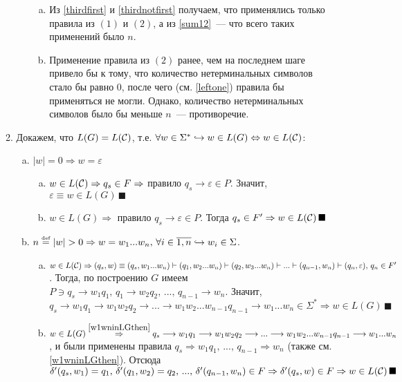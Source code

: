 \documentclass[a4paper]{article}
\def\C{{\cal C}}
\def\eqdef{\overset{\mbox{\tiny def}}{=}}
\begin{document}
\begin{enumerate}
\begin{enumerate}[1.]
\begin{enumerate}[a.]
\begin{enumerate}[a.]
\item Из \ref{thirdfirst} и \ref{thirdnotfirst} получаем, что применялись только правила из $(1)$ и $(2)$, а из \ref{sum12}~--- что всего таких применений было $n$.
\item Применение правила из $(2)$ ранее, чем на последнем шаге привело бы к тому, что количество нетерминальных символов стало бы равно $0$, после чего (см. \ref{leftone}) правила бы применяться не могли. Однако, количество нетерминальных символов было бы меньше $n$~--- противоречие.
\end{enumerate}
\end{enumerate}
\item Докажем, что $L(G)=L(\C)$, т.е. $\forall w\in\Sigma^*\hookrightarrow w\in L(G)\Leftrightarrow w\in L(\C)$:
\begin{enumerate}[a.]
\item $|w|=0\Rightarrow w=\varepsilon$\begin{enumerate}[a.]
\item $w\in L(\C)\Rightarrow q_s\in F\Rightarrow$ правило $q_s\longrightarrow\varepsilon\in P$. Значит, $\varepsilon\equiv w\in L(G)\,\blacksquare$
\item $w\in L(G)\Rightarrow$ правило $q_s\longrightarrow\varepsilon\in P$. Тогда $q_s\in F'\Rightarrow w\in L(\C)\,\blacksquare$
\end{enumerate}
\item $n\eqdef |w|>0\Rightarrow w=w_1...w_n,\,\forall i\in\overline{1,n}\hookrightarrow w_i\in\Sigma$.\begin{enumerate}[a.]
\item $w\in L(\C)\Rightarrow (q_s,w)\equiv(q_s,w_1...w_n)\vdash(q_1,w_2...w_n)\vdash(q_2,w_3...w_n)\vdash...\vdash(q_{n-1},w_n)\vdash(q_n,\varepsilon),\,q_n\in F'$. Тогда, по построению $G$ имеем $P\ni q_s\longrightarrow w_1q_1,\,q_1\longrightarrow w_2q_2,\,...,\,q_{n-1}\longrightarrow w_n$. Значит,\newline
$q_s\longrightarrow w_1q_1\longrightarrow w_1w_2q_2\longrightarrow...\longrightarrow w_1w_2...w_{n-1}q_{n-1}\longrightarrow w_1...w_n\in\Sigma^*\Rightarrow w\in L(G)\,\blacksquare$
\item $w\in L(G)\overset{\ref{w1wninLGthen}}{\Rightarrow}q_s\longrightarrow w_1q_1\longrightarrow w_1w_2q_2\longrightarrow...\longrightarrow w_1w_2...w_{n-1}q_{n-1}\longrightarrow w_1...w_n$, и были применены правила $q_s\Rightarrow w_1q_1,\,...,\,q_{n-1}\Rightarrow w_n$ (также см. \ref{w1wninLGthen}).\newline
Отсюда $\delta'(q_s,w_1)=q_1,\,\delta'(q_1,w_2)=q_2,\,...,\,\delta'(q_{n-1},w_n)\in F\Rightarrow\delta'(q_s,w)\in F\Rightarrow w\in L(\C)\,\blacksquare$

\end{enumerate}
\end{enumerate}
\end{enumerate}
\end{enumerate}
\end{document}
